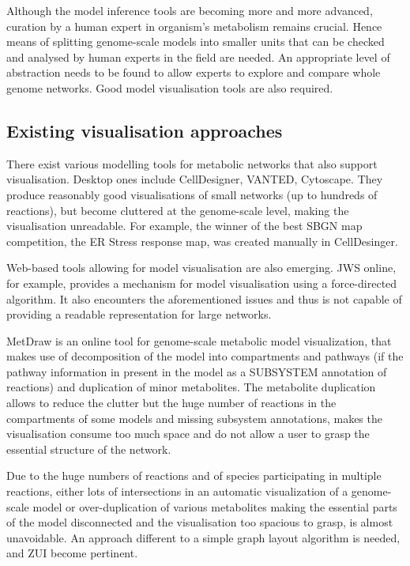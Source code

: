 \documentclass{bmcart}
\begin{document}
Although the model inference tools are becoming more and more advanced, curation by a human expert in organism's metabolism remains crucial. Hence means of splitting genome-scale models into smaller units that can be checked and analysed by human experts in the field are needed. An appropriate level of abstraction needs to be found to allow experts to explore and compare whole genome networks. Good model visualisation tools are also required.

\subsection*{Existing visualisation approaches}
There exist various modelling tools for metabolic networks that also support visualisation. Desktop ones include CellDesigner\cite{Funahashi2008}, VANTED\cite{Rohn2012}, Cytoscape\cite{Smoot2011}. They produce reasonably good visualisations of small networks (up to hundreds of reactions), but become cluttered at the genome-scale level, making the visualisation unreadable. For example, the winner of the best SBGN map competition\cite{SBGN}, the ER Stress response\cite{Groenendyk2010} map,  was created manually in CellDesinger.

Web-based tools allowing for model visualisation are also emerging.  JWS online\cite{Snoep2003}, for example, provides a mechanism for model visualisation using a force-directed algorithm. It also encounters the aforementioned issues and thus is not capable of providing a readable representation for large networks.  

MetDraw\cite{Jensen2014} is an online tool for genome-scale metabolic model visualization, that makes use of decomposition of the model into compartments and pathways (if the pathway information in present in the model as a SUBSYSTEM annotation of reactions) and duplication of minor metabolites. The metabolite duplication allows to reduce the clutter but the huge number of reactions in the compartments of some models and missing subsystem annotations, makes the visualisation consume too much space and do not allow a user to grasp the essential structure of the network.

Due to the huge numbers of reactions and of species participating in multiple reactions, either lots of intersections in an automatic visualization of a genome-scale model or over-duplication of various metabolites making the essential parts of the model disconnected and the visualisation too spacious to grasp, is almost unavoidable. An approach different to a simple graph layout algorithm is needed, and ZUI become pertinent.
\end{document}
